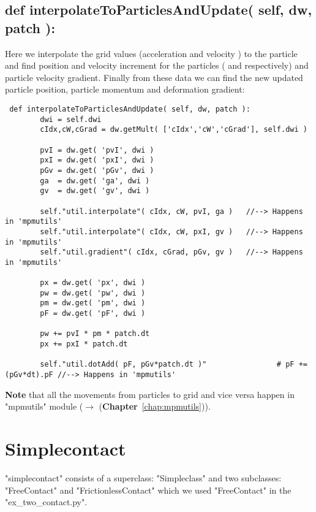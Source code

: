 \documentclass[11pt,fleqn]{book} %
\begin{document}
\section{ def interpolateToParticlesAndUpdate( self, dw, patch ): }
Here we interpolate the grid values (acceleration  and velocity ) to the particle and find position and velocity increment for the particles ( and  respectively) and particle velocity gradient. Finally from these data we can find the new updated particle position, particle momentum and deformation gradient:

\begin{lstlisting}
 def interpolateToParticlesAndUpdate( self, dw, patch ):         
        dwi = self.dwi
        cIdx,cW,cGrad = dw.getMult( ['cIdx','cW','cGrad'], self.dwi )

        pvI = dw.get( 'pvI', dwi )
        pxI = dw.get( 'pxI', dwi )
        pGv = dw.get( 'pGv', dwi )
        ga  = dw.get( 'ga', dwi )
        gv  = dw.get( 'gv', dwi )
        
        self."util.interpolate"( cIdx, cW, pvI, ga )   //--> Happens in 'mpmutils'
        self."util.interpolate"( cIdx, cW, pxI, gv )   //--> Happens in 'mpmutils'
        self."util.gradient"( cIdx, cGrad, pGv, gv )   //--> Happens in 'mpmutils'
        
        px = dw.get( 'px', dwi )
        pw = dw.get( 'pw', dwi )
        pm = dw.get( 'pm', dwi )        
        pF = dw.get( 'pF', dwi )
        
        pw += pvI * pm * patch.dt
        px += pxI * patch.dt
        
        self."util.dotAdd( pF, pGv*patch.dt )"                # pF += (pGv*dt).pF //--> Happens in 'mpmutils'
\end{lstlisting}

\textbf{Note} that all the movements from particles to grid and vice versa happen in "mpmutils" module ($\rightarrow$ (\textbf{Chapter}~\ref{chap:mpmutils})).




\chapter{Simplecontact}
\label{chap:simplecontact}
"simplecontact" consists of a superclass: "Simpleclass" and two subclasses: "FreeContact" and "FrictionlessContact" which we used "FreeContact" in the "ex\_two\_contact.py".
\end{document}
